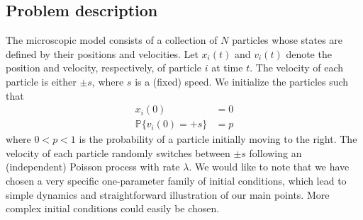 \documentclass[preprint]{elsarticle}
\begin{document}
\subsection{Problem description}

The microscopic model consists of a collection of $N$ particles whose states are defined by their positions and velocities. 
%
Let $x_i(t)$ and $v_i(t)$ denote the position and velocity, respectively, of particle $i$ at time $t$.
%
The velocity of each particle is either $\pm s$, where $s$ is a (fixed) speed. 
%
We initialize the particles such that
\begin{equation}\label{eqn:system}
\begin{aligned}
x_i(0) & = 0 \\
\mathbb{P} \{ v_i(0) = +s \} & = p
\end{aligned}
\end{equation}
where $0 < p < 1$ is the probability of a particle initially moving to the right.
%
The velocity of each particle randomly switches between $\pm s$ following an (independent) Poisson process with rate $\lambda$.
%
We would like to note that we have chosen a very specific one-parameter family of initial conditions, which lead to simple dynamics and straightforward illustration of our main points.
%
More complex initial conditions could easily be chosen. 
\end{document}
